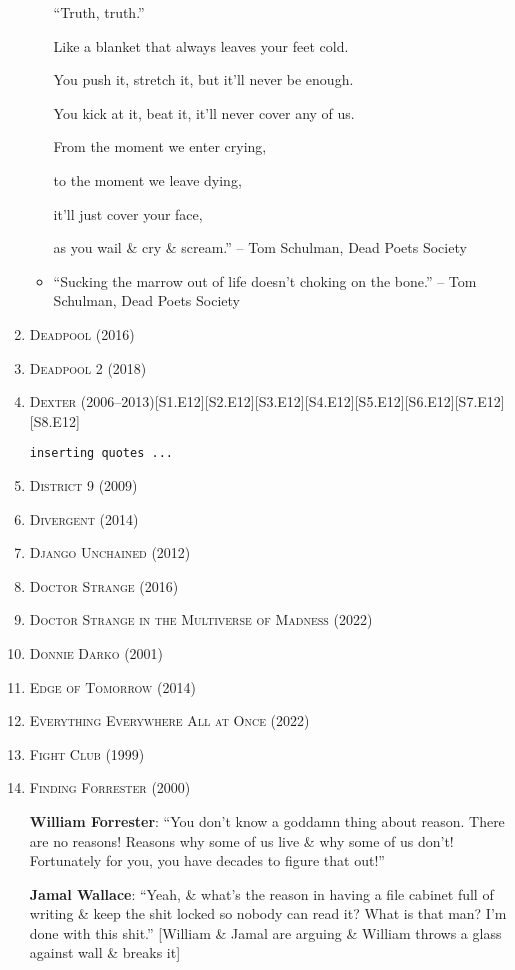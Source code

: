 \documentclass{article}
\begin{document}
\begin{enumerate}
\begin{itemize}
		``Truth, truth.''
		
		Like a blanket that always leaves your feet cold.
		
		You push it, stretch it, but it'll never be enough.
		
		You kick at it, beat it, it'll never cover any of us.
		
		From the moment we enter crying,
		
		to the moment we leave dying,
		
		it'll just cover your face,
		
		as you wail \& cry \& scream.'' -- Tom Schulman, Dead Poets Society
		\item ``Sucking the marrow out of life doesn't choking on the bone.'' -- Tom Schulman, Dead Poets Society
	\end{itemize}
	\item \textsc{Deadpool} (2016)
	\item \textsc{Deadpool 2} (2018)
	\item \textsc{Dexter} (2006--2013)\hfill[S1.E12][S2.E12][S3.E12][S4.E12][S5.E12][S6.E12][S7.E12][S8.E12]
	
	\texttt{inserting quotes ...}
	\item \textsc{District 9} (2009)
	\item \textsc{Divergent} (2014)
	\item \textsc{Django Unchained} (2012)
	\item \textsc{Doctor Strange} (2016)
	\item \textsc{Doctor Strange in the Multiverse of Madness} (2022)
	\item \textsc{Donnie Darko} (2001)
	\item \textsc{Edge of Tomorrow} (2014)
	\item \textsc{Everything Everywhere All at Once} (2022)
	\item \textsc{Fight Club} (1999)
	\item \textsc{Finding Forrester} (2000)
	
	\textbf{William Forrester}: ``You don't know a goddamn thing about reason. There are no reasons! Reasons why some of us live \& why some of us don't! Fortunately for you, you have decades to figure that out!''
	
	\textbf{Jamal Wallace}: ``Yeah, \& what's the reason in having a file cabinet full of writing \& keep the shit locked so nobody can read it? What is that man? I'm done with this shit.'' [William \& Jamal are arguing \& William throws a glass against wall \& breaks it]
	

\end{enumerate}
\end{document}
